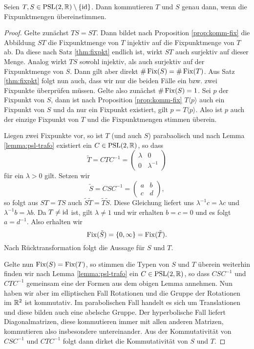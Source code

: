 \begin{thm}
  \label{thm:komm-fix}
  Seien $T,S \in \operatorname{PSL}(2, \mathbb{R})\setminus \{\operatorname{id}\}$. Dann kommutieren $T$ und $S$ genau dann,
  wenn die Fixpunktmengen übereinstimmen.
\end{thm}

\begin{proof}
  Gelte zunächst $TS = ST$. Dann bildet nach Proposition
  \ref{prop:komm-fix} die Abbildung $ST$ die Fixpunktmenge von $T$
  injektiv auf die Fixpunktmenge von $T$ ab. Da diese nach Satz
  \ref{thm:fixpkt} endlich ist, wirkt $ST$ auch surjektiv auf dieser
  Menge. Analog wirkt $TS$ sowohl injektiv, als auch surjektiv auf der
  Fixpunktmenge von $S$. Dann gilt aber direkt $\# \operatorname{Fix}(S) = \#
  \operatorname{Fix}(T)$. Aus Satz \ref{thm:fixpkt} folgt nun auch, dass wir nur die
  beiden Fälle ein bzw. zwei Fixpunkte überprüfen müssen. Gelte also
  zunächst $\# \operatorname{Fix}(S) = 1$. Sei $p$ der Fixpunkt von $S$, dann ist
  nach Proposition \ref{prop:komm-fix} $T\langle p \rangle$ auch ein
  Fixpunkt von $S$ und da nur ein Fixpunkt existiert, gilt $ p = T
  \langle p \rangle$. Also ist $p$ auch der einzige Fixpunkt von $T$
  und die Fixpunktmengen stimmen überein.

  Liegen zwei Fixpunkte vor, so ist $T$ (und auch
  $S$) parabaolisch und nach Lemma \ref{lemma:psl-trafo} existiert ein
  $C \in \operatorname{PSL}(2,\mathbb{R})$, so dass
  \[
  \tilde T = C T C^{-1} =
  \begin{pmatrix}
    \lambda & 0 \\
    0 & \lambda^{-1}
  \end{pmatrix}
  \]
  für ein $\lambda > 0$ gilt. Setzen wir
  \[
  \tilde S = C S C^{-1} =
  \begin{pmatrix}
    a & b \\
    c & d
  \end{pmatrix},
  \]
  so folgt aus $ST = TS$ auch $\tilde S \tilde T = \tilde T \tilde
  S$. Diese Gleichung liefert uns $\lambda^{-1} c = \lambda c$ und
  $\lambda^{-1} b = \lambda b$. Da $T \neq \operatorname{id}$ ist, gilt $\lambda \neq 1$ und
  wir erhalten $b = c = 0$ und es folgt $a = d^{-1}$. Also
  erhalten wir
  \[
  \operatorname{Fix}(\tilde S) = \{0, \infty\} = \operatorname{Fix}(\tilde T).
  \]
  Nach Rücktransformation folgt die Aussage für $S$ und $T$.

  Gelte nun $\operatorname{Fix}(S) = \operatorname{Fix}(T)$, so stimmen die Typen von $S$ und $T$
  überein weiterhin finden wir nach Lemma \ref{lemma:psl-trafo} ein $C
  \in \operatorname{PSL}(2, \mathbb{R})$, so dass $C S C^{-1}$ und $C T C^{-1}$ gemeinsam
  eine der Formen aus dem obigen Lemma annehmen. Nun haben wir aber im
  elliptischen Fall Rotationen und die Gruppe der Rotationen im $\mathbb{R}^2$
  ist kommutativ. Im parabolischen Fall handelt es sich um
  Translationen und diese bilden auch eine abelsche Gruppe. Der
  hyperbolische Fall liefert Diagonalmatrizen, diese kommutieren immer
  mit allen anderen Matrizen, kommutieren also insbesondere
  untereinander. Aus der Kommutativität von $C S C^{-1}$ und $C T
  C^{-1}$ folgt dann dirket die Kommutativität von $S$ und $T$.
\end{proof}

